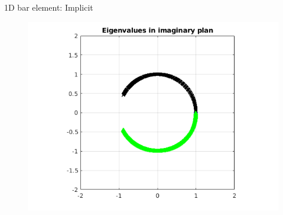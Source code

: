 \begin{frame}{1D bar element: Implicit}
\begin{figure}[ht] 
  \label{ fig7} 
  \begin{minipage}[b]{0.5\linewidth}
    \centering
    \includegraphics[scale=.35]{images/bar-imp-1.png} \\


\end{minipage}
\end{figure}
\end{frame}

